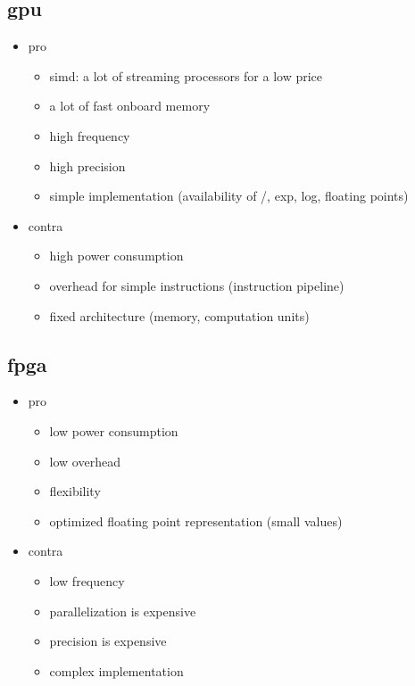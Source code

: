 \documentclass[mscthesis]{usiinfthesis}
\begin{document}
\subsection{gpu}
\begin{itemize}
    \item pro
    \begin{itemize}
        \item simd: a lot of streaming processors for a low price
        \item a lot of fast onboard memory
        \item high frequency
        \item high precision
        \item simple implementation (availability of /, exp, log,
            floating points)
    \end{itemize}
    \item contra
    \begin{itemize}
        \item high power consumption
        \item overhead for simple instructions (instruction pipeline)
        \item fixed architecture (memory, computation units)
    \end{itemize}
\end{itemize}

\subsection{fpga}
\begin{itemize}
    \item pro
    \begin{itemize}
        \item low power consumption
        \item low overhead
        \item flexibility
        \item optimized floating point representation (small values)
    \end{itemize}
    \item contra
    \begin{itemize}
        \item low frequency
        \item parallelization is expensive
        \item precision is expensive
        \item complex implementation
    \end{itemize}
\end{itemize}
\end{document}
